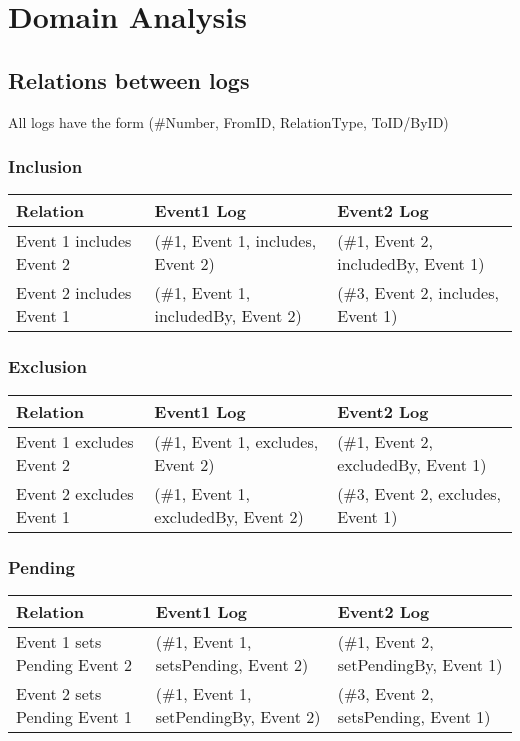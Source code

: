 \chapter{Domain Analysis}
\label{chap:domainanalysis}
\section{ Relations between logs}
All logs have the form (\#Number, FromID, RelationType, ToID/ByID)
\subsection{Inclusion}
\begin{tabularx}{\linewidth}{ | X | X | X | }
  \hline
  Relation & Event1 Log & Event2 Log \\
  \hline
  Event 1 includes Event 2 & (\#1, Event 1, includes, Event 2) & (\#1, Event 2, includedBy, Event 1) \\
  \hline
  Event 2 includes Event 1 & (\#1, Event 1, includedBy, Event 2) & (\#3, Event 2, includes, Event 1) \\
  \hline
\end{tabularx}

\subsection{Exclusion}

\begin{tabularx}{\linewidth}{ | X | X | X | }
  \hline
  Relation & Event1 Log & Event2 Log \\
  \hline
  Event 1 excludes Event 2 & (\#1, Event 1, excludes, Event 2) & (\#1, Event 2, excludedBy, Event 1) \\
  \hline
  Event 2 excludes Event 1 & (\#1, Event 1, excludedBy, Event 2) & (\#3, Event 2, excludes, Event 1) \\
  \hline
\end{tabularx}

\subsection{Pending}
\begin{tabularx}{\linewidth}{ | X | X | X | }
  \hline
  Relation & Event1 Log & Event2 Log \\
  \hline
  Event 1 sets Pending Event 2 & (\#1, Event 1, setsPending, Event 2) & (\#1, Event 2, setPendingBy, Event 1) \\
  \hline
  Event 2 sets Pending Event 1 & (\#1, Event 1, setPendingBy, Event 2) & (\#3, Event 2, setsPending, Event 1) \\
  \hline
\end{tabularx}


